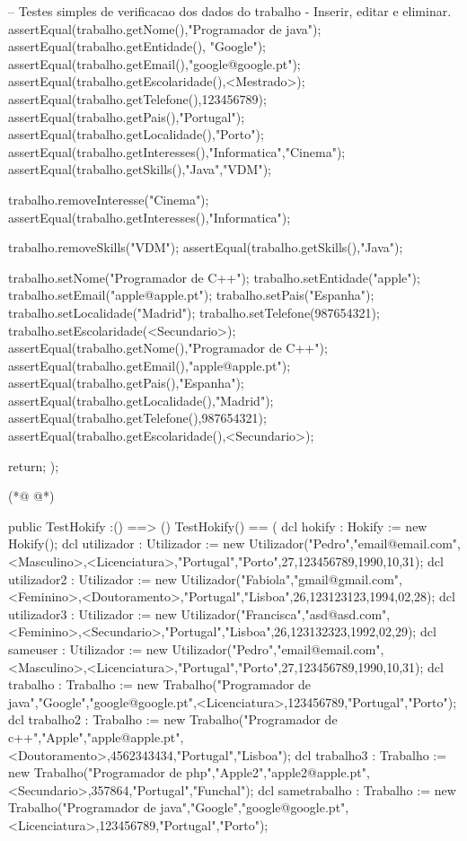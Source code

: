 \begin{vdmpp}[breaklines=true]
 -- Testes simples de verificacao dos dados do trabalho - Inserir, editar e eliminar.
 assertEqual(trabalho.getNome(),"Programador de java");
 assertEqual(trabalho.getEntidade(), "Google");
 assertEqual(trabalho.getEmail(),"google@google.pt");
 assertEqual(trabalho.getEscolaridade(),<Mestrado>);
 assertEqual(trabalho.getTelefone(),123456789);
 assertEqual(trabalho.getPais(),"Portugal");
 assertEqual(trabalho.getLocalidade(),"Porto");
 assertEqual(trabalho.getInteresses(),{"Informatica","Cinema"});
 assertEqual(trabalho.getSkills(),{"Java","VDM"});
 
 trabalho.removeInteresse("Cinema");
 assertEqual(trabalho.getInteresses(),{"Informatica"});
 
 trabalho.removeSkills("VDM");
 assertEqual(trabalho.getSkills(),{"Java"});
 
 trabalho.setNome("Programador de C++");
 trabalho.setEntidade("apple");
 trabalho.setEmail("apple@apple.pt");
 trabalho.setPais("Espanha");
 trabalho.setLocalidade("Madrid");
 trabalho.setTelefone(987654321);
 trabalho.setEscolaridade(<Secundario>);
 assertEqual(trabalho.getNome(),"Programador de C++");
 assertEqual(trabalho.getEmail(),"apple@apple.pt");
 assertEqual(trabalho.getPais(),"Espanha");
 assertEqual(trabalho.getLocalidade(),"Madrid");
 assertEqual(trabalho.getTelefone(),987654321);
 assertEqual(trabalho.getEscolaridade(),<Secundario>);

 return;
);

(*@
\label{TestHokify:104}
@*)

public TestHokify :() ==> ()
TestHokify() ==
(
 dcl hokify : Hokify := new Hokify();
 dcl utilizador : Utilizador := new Utilizador("Pedro","email@email.com",<Masculino>,<Licenciatura>,"Portugal","Porto",27,123456789,1990,10,31);
 dcl utilizador2 : Utilizador := new Utilizador("Fabiola","gmail@gmail.com",<Feminino>,<Doutoramento>,"Portugal","Lisboa",26,123123123,1994,02,28);
 dcl utilizador3 : Utilizador := new Utilizador("Francisca","asd@asd.com",<Feminino>,<Secundario>,"Portugal","Lisboa",26,123132323,1992,02,29);
 dcl sameuser : Utilizador := new Utilizador("Pedro","email@email.com",<Masculino>,<Licenciatura>,"Portugal","Porto",27,123456789,1990,10,31);
 dcl trabalho : Trabalho := new Trabalho("Programador de java","Google","google@google.pt",<Licenciatura>,123456789,"Portugal","Porto");
 dcl trabalho2 : Trabalho := new Trabalho("Programador de c++","Apple","apple@apple.pt",<Doutoramento>,4562343434,"Portugal","Lisboa");
 dcl trabalho3 : Trabalho := new Trabalho("Programador de php","Apple2","apple2@apple.pt",<Secundario>,357864,"Portugal","Funchal");
 dcl sametrabalho : Trabalho := new Trabalho("Programador de java","Google","google@google.pt",<Licenciatura>,123456789,"Portugal","Porto");
 

\end{vdmpp}
